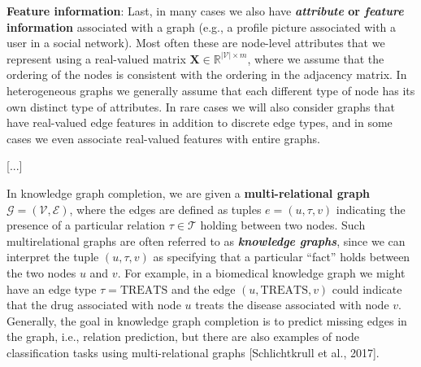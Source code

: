 \documentclass{article}
\begin{document}
\begin{itemize}
\begin{displayquote}
\textbf{Feature information}: Last, in many cases we also have \textbf{\textit{attribute} or \textit{feature} information} associated with a graph (e.g., a profile picture associated with a user in a social network). Most often these are node-level attributes that we represent using a real-valued matrix $ \mathbf{X} \in \mathbb{R}^{|\mathcal{V}| \times m} $, where we assume that the ordering of the nodes is consistent with the ordering in the adjacency matrix. In heterogeneous graphs we generally assume that each different type of node has its own distinct type of attributes. In rare cases we will also consider graphs that have real-valued edge features in addition to discrete edge types, and in some cases we even associate real-valued features with entire graphs.

[...]

In knowledge graph completion, we are given a \textbf{multi-relational graph} $ \mathcal{G} = (\mathcal{V}, \mathcal{E})$, where the edges are defined as tuples $ e = (u, \tau, v) $ indicating the presence of a particular relation $ \tau \in \mathcal{T} $ holding between two nodes. Such multirelational graphs are often referred to as \textbf{\textit{knowledge graphs}}, since we can interpret the tuple $ (u, \tau, v) $ as specifying that a particular “fact” holds between the two nodes $ u $ and $ v $. For example, in a biomedical knowledge graph we might have an edge type $ \tau = \textrm{TREATS} $ and the edge $ (u, \textrm{TREATS}, v) $ could indicate that the drug associated with node $ u $ treats the disease associated with node $ v $. Generally, the goal in knowledge graph completion is to predict missing edges in the graph, i.e., relation prediction, but there are also examples of node classification tasks using multi-relational graphs [Schlichtkrull et al., 2017].
\end{displayquote}

\end{itemize}
\end{document}
